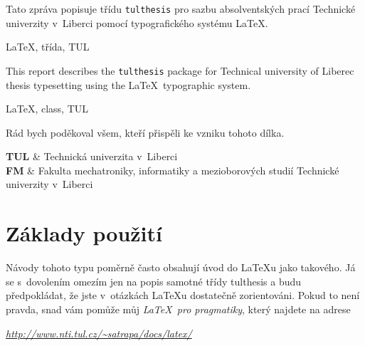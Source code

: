\documentclass[FM,DP,EN]{tulthesis}
\newcommand{\argument}[1]{{\ttfamily\color{\tulcolor}#1}}
\newenvironment{myquote}{\begin{list}{}{\setlength\leftmargin\parindent}\item[]}{\end{list}}
\begin{document}

\begin{abstractCZ}
Tato zpráva popisuje třídu \texttt{tulthesis} pro sazbu absolventských prací
Technické univerzity v~Liberci pomocí typografického systému \LaTeX.
\end{abstractCZ}

\begin{keywordsCZ}
\LaTeX, třída, TUL
\end{keywordsCZ}

\vspace{2cm}

\begin{abstractEN}
This report describes the \texttt{tulthesis} package for Technical university of
Liberec thesis typesetting using the \LaTeX\ typographic system.
\end{abstractEN}

\begin{keywordsEN}
\LaTeX, class, TUL
\end{keywordsEN}

\clearpage

\begin{acknowledgement}
Rád bych poděkoval všem, kteří přispěli ke vzniku tohoto dílka.
\end{acknowledgement}

\tableofcontents

\clearpage

\begin{abbrList}
\textbf{TUL} & Technická univerzita v~Liberci \\
\textbf{FM} & Fakulta mechatroniky, informatiky a mezioborových studií
Technické univerzity v~Liberci
\end{abbrList}


\chapter{Základy použití}

Návody tohoto typu poměrně často obsahují úvod do \LaTeX u jako takového. Já se
s~dovolením omezím jen na popis samotné třídy \argument{tulthesis} a budu
předpokládat, že jste v~otázkách \LaTeX u dostatečně zorientováni. Pokud
to není pravda, snad vám pomůže můj \emph{\LaTeX\ pro pragmatiky}, který
najdete na adrese

\begin{myquote}
\href{http://www.nti.tul.cz/~satrapa/docs/latex/}{\emph{http://www.nti.tul.cz/\textasciitilde satrapa/docs/latex/}}
\end{myquote}
\end{document}
